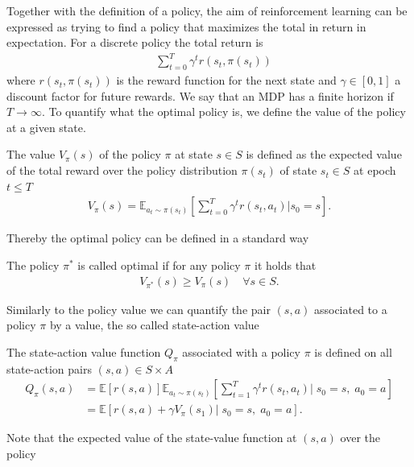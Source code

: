 Together with the definition of a policy, the aim of reinforcement learning
can be expressed as trying to find a policy that maximizes the total in
return in expectation. For a discrete policy the total return is
\begin{align}
    &\sum_{t=0}^{T}\gamma^{t} r(s_t, \pi(s_t))
\end{align}
where $r(s_t, \pi(s_t))$ is the reward function for the next state and
$\gamma \in [0, 1]$ a discount factor for future rewards. We say that an MDP
has a finite horizon if $T \to \infty$. To quantify what
the optimal policy is, we define the value of the policy at a given state.
\begin{definition}
    The value $V_\pi(s)$ of the policy $\pi$ at state $s \in S$ is defined as
    the expected value of the total reward over the policy distribution
    $\pi(s_t)$ of state $s_t \in S$ at epoch $t \le T$
    \begin{align}
        V_\pi(s) = \mathbb{E}_{a_t\sim\pi(s_t)}\left[\sum_{t=0}^{T}
        \gamma^{t} r(s_t, a_t) \Bigg| s_0 = s \right].
    \end{align}
\end{definition}
Thereby the optimal policy can be defined in a standard way
\begin{definition}
    The policy $\pi^{*}$ is called optimal if for any policy $\pi$ it
    holds that
    \begin{align}
        V_{\pi^{*}}(s) \ge V_\pi(s) \quad \forall s \in S.
    \end{align}
\end{definition}
Similarly to the policy value we can quantify the pair $(s, a)$ associated to a
policy $\pi$ by a value, the so called state-action value
\begin{definition}
    \label{def: state-action}
    The state-action value function $Q_\pi$ associated with a policy $\pi$ is
    defined on all state-action pairs $(s, a) \in S \times A$
    \begin{align}
        Q_\pi(s, a) &= \mathbb{E}[r(s,a)]
        \mathbb{E}_{a_t\sim\pi(s_t)}\left[ \sum_{t=1}^{T}\gamma^{t}
            r(s_t, a_t)\Bigg |\; s_0 = s,\; a_0 = a \right] \\
        \nonumber
            &= \mathbb{E}\left[r(s,a) + \gamma V_\pi(s_1)\Big| \;s_0=s,\;
            a_0=a   \right].
    \end{align}
\end{definition}
Note that the expected value of the state-value function at $(s, a)$ over the policy
